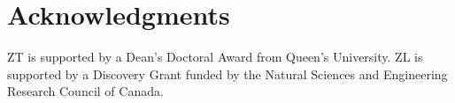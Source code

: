 \section*{Acknowledgments}

ZT is supported by a Dean’s Doctoral Award from Queen’s University. ZL is supported by a Discovery Grant funded by the Natural Sciences and Engineering Research Council of Canada.



\address{Zhiwen Tan\\

  Department of Public Health Sciences\\

  Queen's University}

\address{Chang Shen\\

  Department of Electrical and Computer Engineering\\

  Queen's University}

\address{Zihang Lu\\

  Department of Public Health Sciences\\

  \emph{and} Department of Mathematics and Statistics\\

  Queen's University\\

  }
